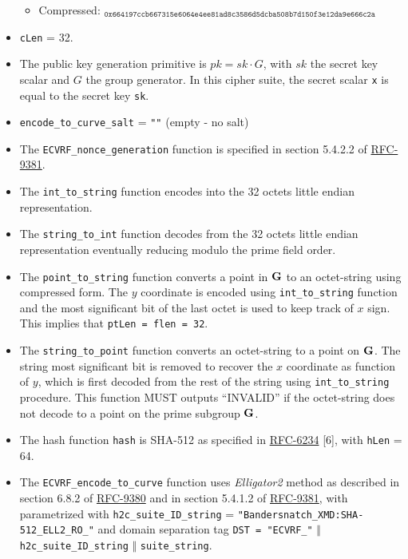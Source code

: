 \documentclass[
]{article}
\providecommand{\tightlist}{%
  \setlength{\itemsep}{0pt}\setlength{\parskip}{0pt}}
\begin{document}
\begin{itemize}
  \begin{itemize}
  \tightlist
  \item
    Compressed:
    \(_{\texttt{0x664197ccb667315e6064e4ee81ad8c3586d5dcba508b7d150f3e12da9e666c2a}}\)
  \end{itemize}
\item
  \texttt{cLen} = 32.
\item
  The public key generation primitive is \(pk = sk \cdot G\), with
  \(sk\) the secret key scalar and \(G\) the group generator. In this
  cipher suite, the secret scalar \texttt{x} is equal to the secret key
  \texttt{sk}.
\item
  \texttt{encode\_to\_curve\_salt} = \texttt{""} (empty - no salt)
\item
  The \texttt{ECVRF\_nonce\_generation} function is specified in section
  5.4.2.2 of \href{https://datatracker.ietf.org/doc/rfc9381}{RFC-9381}.
\item
  The \texttt{int\_to\_string} function encodes into the 32 octets
  little endian representation.
\item
  The \texttt{string\_to\_int} function decodes from the 32 octets
  little endian representation eventually reducing modulo the prime
  field order.
\item
  The \texttt{point\_to\_string} function converts a point in
  \(\bold{G}\) to an octet-string using compressed form. The \(y\)
  coordinate is encoded using \texttt{int\_to\_string} function and the
  most significant bit of the last octet is used to keep track of \(x\)
  sign. This implies that \texttt{ptLen\ =\ flen\ =\ 32}.
\item
  The \texttt{string\_to\_point} function converts an octet-string to a
  point on \(\bold{G}\). The string most significant bit is removed to
  recover the \(x\) coordinate as function of \(y\), which is first
  decoded from the rest of the string using \texttt{int\_to\_string}
  procedure. This function MUST outputs ``INVALID'' if the octet-string
  does not decode to a point on the prime subgroup \(\bold{G}\).
\item
  The hash function \texttt{hash} is SHA-512 as specified in
  \href{https://datatracker.ietf.org/doc/rfc6234}{RFC-6234} {[}6{]},
  with \texttt{hLen} = 64.
\item
  The \texttt{ECVRF\_encode\_to\_curve} function uses \emph{Elligator2}
  method as described in section 6.8.2 of
  \href{https://datatracker.ietf.org/doc/rfc9380}{RFC-9380} and in
  section 5.4.1.2 of
  \href{https://datatracker.ietf.org/doc/rfc9381}{RFC-9381}, with
  parametrized with \texttt{h2c\_suite\_ID\_string} =
  \texttt{"Bandersnatch\_XMD:SHA-512\_ELL2\_RO\_"} and domain separation
  tag \texttt{DST\ =\ "ECVRF\_"} \(\Vert\)
  \texttt{h2c\_suite\_ID\_string} \(\Vert\) \texttt{suite\_string}.
\end{itemize}
\end{document}
